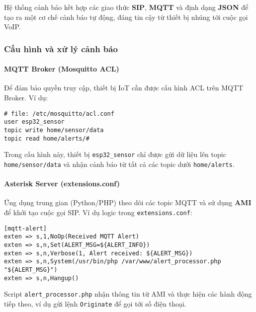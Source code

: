 Hệ thống cảnh báo kết hợp các giao thức \textbf{SIP}, \textbf{MQTT} và định dạng \textbf{JSON} để tạo ra một cơ chế cảnh báo tự động, đáng tin cậy từ thiết bị nhúng tới cuộc gọi VoIP.

\subsubsection{Cấu hình và xử lý cảnh báo}
\paragraph{MQTT Broker (Mosquitto ACL)}
Để đảm bảo quyền truy cập, thiết bị IoT cần được cấu hình ACL trên MQTT Broker. Ví dụ:
\begin{verbatim}
# file: /etc/mosquitto/acl.conf
user esp32_sensor
topic write home/sensor/data
topic read home/alerts/#
\end{verbatim}
Trong cấu hình này, thiết bị \texttt{esp32\_sensor} chỉ được gửi dữ liệu lên topic \texttt{home/sensor/data} và nhận cảnh báo từ tất cả các topic dưới \texttt{home/alerts}.

\paragraph{Asterisk Server (extensions.conf)}
Ứng dụng trung gian (Python/PHP) theo dõi các topic MQTT và sử dụng \textbf{AMI} để khởi tạo cuộc gọi SIP. Ví dụ logic trong \texttt{extensions.conf}:
\begin{verbatim}
[mqtt-alert]
exten => s,1,NoOp(Received MQTT Alert)
exten => s,n,Set(ALERT_MSG=${ALERT_INFO})
exten => s,n,Verbose(1, Alert received: ${ALERT_MSG})
exten => s,n,System(/usr/bin/php /var/www/alert_processor.php "${ALERT_MSG}")
exten => s,n,Hangup()
\end{verbatim}
Script \texttt{alert\_processor.php} nhận thông tin từ AMI và thực hiện các hành động tiếp theo, ví dụ gửi lệnh \texttt{Originate} để gọi tới số điện thoại.

